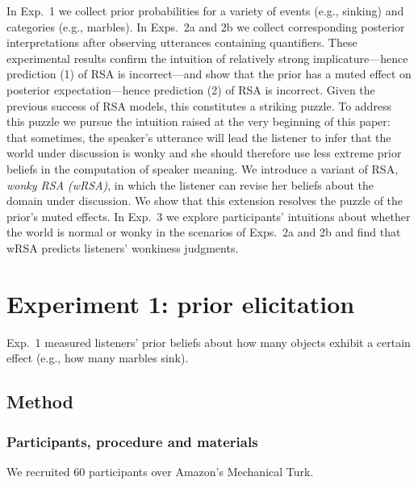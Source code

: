 \documentclass[10pt,letterpaper]{article}
\begin{document}
In Exp.~1 we collect prior probabilities for a variety of events (e.g., sinking) and categories (e.g., marbles). In Exps.~2a and 2b we collect corresponding posterior interpretations after observing  utterances containing quantifiers. These experimental results confirm the intuition of relatively strong implicature---hence prediction (1) of RSA is incorrect---and show that the prior has a muted effect on posterior expectation---hence prediction (2) of RSA is incorrect.
Given the previous success of RSA models, this constitutes a striking puzzle. 
To address this puzzle we pursue the intuition raised at the very beginning of this paper: that sometimes, the speaker's utterance will lead the listener to infer that the world under discussion is wonky and she should therefore use less extreme prior beliefs in the computation of speaker meaning. We introduce a variant of RSA, \emph{wonky RSA (wRSA)}, in which the listener can revise her beliefs about the domain under discussion. We show that this extension resolves the puzzle of the prior's muted effects.
In Exp.~3 we explore participants' intuitions about whether the world is normal or wonky in the scenarios of Exps.~2a and 2b and find that wRSA predicts listeners' wonkiness judgments.


\section{Experiment 1: prior elicitation} 

Exp.~1 measured listeners' prior beliefs about how many objects exhibit a certain effect (e.g., how many marbles sink).%

\subsection{Method}

\subsubsection{Participants, procedure and materials}

We recruited 60 participants over Amazon's Mechanical Turk.
\end{document}

